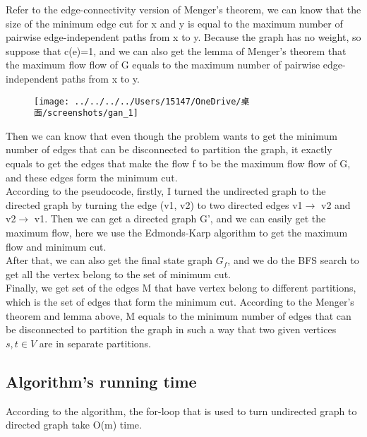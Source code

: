 \documentclass[]{article}
\begin{document}
	\noindent Refer to the edge-connectivity version of Menger's theorem, we can know that the size of the minimum edge cut for x and y is equal to the maximum number of pairwise edge-independent paths from x to y. Because the graph has no weight, so suppose that c(e)=1, and we can also get the lemma of Menger's theorem that the maximum flow flow of G equals to the maximum number of pairwise edge-independent paths from x to y. \\
	
	\begin{figure}
		\centering
		\texttt{[image: ../../../../Users/15147/OneDrive/桌面/screenshots/gan\_1]}
		\caption{}
		\label{fig:gan1}
	\end{figure}
	
	
	\noindent Then we can know that even though the problem wants to get the minimum number of edges that can be disconnected to partition the graph, it exactly equals to get the edges that make the flow f to be the maximum flow flow of G, and these edges form the minimum cut.   \\
	
	\noindent According to the pseudocode, firstly, I turned the undirected graph to the directed graph by turning the edge (v1, v2) to two directed edges v1$\rightarrow$ v2 and v2$\rightarrow$ v1. Then we can get a directed graph G', and we can easily get the maximum flow, here we use the Edmonds-Karp algorithm to get the maximum flow and minimum cut.  \\
	
	\noindent After that, we can also get the final state graph $G_{f}$, and we do the BFS search to get all the vertex belong to the set of minimum cut.   \\
	
	\noindent Finally, we get set of the edges M that have vertex belong to different partitions, which is the set of edges that form the minimum cut. According to the Menger's theorem and lemma above, M equals to the minimum number of edges that can be disconnected to partition the graph in such a way that two given vertices $s,t\in V$ are in separate partitions.   \\
	
	
	\subsection{Algorithm's running time}
	
	\noindent According to the algorithm, the for-loop that is used to turn undirected graph to directed graph take O(m) time.  \\
	
\end{document}

